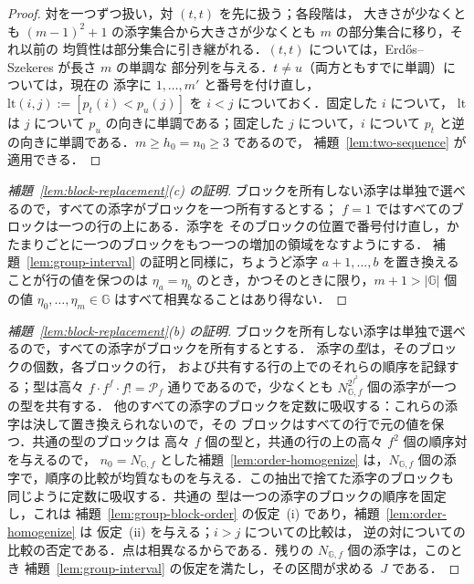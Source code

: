 \documentclass[11pt,a4paper]{ltjsarticle}
\numberwithin{equation}{section}
\theoremstyle{plain}
\theoremstyle{definition}
\theoremstyle{remark}
\theoremstyle{plain}
\begin{document}
\begin{proof}
対を一つずつ扱い，対 $(t,t)$ を先に扱う；各段階は，
大きさが少なくとも $(m-1)^2+1$ の添字集合から大きさが少なくとも $m$ の部分集合に移り，それ以前の
均質性は部分集合に引き継がれる．$(t,t)$ については，Erd\H{o}s--Szekeres が長さ $m$ の単調な
部分列を与える．$t\ne u$（両方ともすでに単調）については，現在の
添字に $1,\ldots,m'$ と番号を付け直し，$\mathrm{lt}(i,j):=[p_t(i)<p_u(j)]$ を $i<j$ についておく．固定した $i$ について，
$\mathrm{lt}$ は $j$ について $p_u$ の向きに単調である；固定した $j$ について，$i$ について
$p_t$ と逆の向きに単調である．$m\ge h_0=n_0\ge3$ であるので，
補題~\ref{lem:two-sequence} が適用できる．
\end{proof}

\begin{proof}[補題~\ref{lem:block-replacement}\textup{(c)} の証明]
ブロックを所有しない添字は単独で選べるので，すべての添字がブロックを一つ所有するとする；
$f=1$ ではすべてのブロックは一つの行の上にある．添字を
そのブロックの位置で番号付け直し，かたまりごとに一つのブロックをもつ一つの増加の領域をなすようにする．
補題~\ref{lem:group-interval} の証明と同様に，ちょうど添字
$a+1,\ldots,b$ を置き換えることが行の値を保つのは $\eta_a=\eta_b$ のとき，かつそのときに限り，$m+1>|{\mathbb G}|$
個の値 $\eta_0,\ldots,\eta_m\in{\mathbb G}$ はすべて相異なることはあり得ない．
\end{proof}

\begin{proof}[補題~\ref{lem:block-replacement}\textup{(b)} の証明]
ブロックを所有しない添字は単独で選べるので，すべての添字がブロックを所有するとする．
添字の\emph{型}は，そのブロックの個数，各ブロックの行，
および共有する行の上でのそれらの順序を記録する；型は高々 $f\cdot f^f\cdot f!=\mathcal P_f$
通りであるので，少なくとも $N_{{\mathbb G},f}^{2^{f^2}}$ 個の添字が一つの型を共有する．
他のすべての添字のブロックを定数に吸収する：これらの添字は決して置き換えられないので，その
ブロックはすべての行で元の値を保つ．共通の型のブロックは
高々 $f$ 個の型と，共通の行の上の高々 $f^2$ 個の順序対を与えるので，
$n_0=N_{{\mathbb G},f}$ とした補題~\ref{lem:order-homogenize} は，$N_{{\mathbb G},f}$
個の添字で，順序の比較が均質なものを与える．この抽出で捨てた添字のブロックも
同じように定数に吸収する．共通の
型は一つの添字のブロックの順序を固定し，これは
補題~\ref{lem:group-block-order} の仮定~(i) であり，補題~\ref{lem:order-homogenize} は
仮定~(ii) を与える；$i>j$ についての比較は，
逆の対についての比較の否定である．点は相異なるからである．残りの
$N_{{\mathbb G},f}$ 個の添字は，このとき
補題~\ref{lem:group-interval} の仮定を満たし，その区間が求める~$J$ である．
\end{proof}
\end{document}
